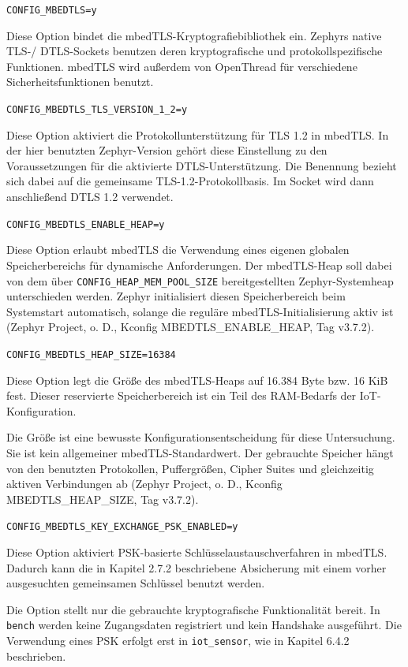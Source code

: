 \lstinline[style=codeinline]|CONFIG_MBEDTLS=y|

Diese Option bindet die mbedTLS-Kryptografiebibliothek ein. Zephyrs native TLS-/ DTLS-Sockets benutzen deren kryptografische und protokollspezifische Funktionen. mbedTLS wird au{\ss}erdem von OpenThread f{\"u}r verschiedene Sicherheitsfunktionen benutzt.

\lstinline[style=codeinline]|CONFIG_MBEDTLS_TLS_VERSION_1_2=y|

Diese Option aktiviert die Protokollunterst{\"u}tzung f{\"u}r TLS 1.2 in mbedTLS. In der hier benutzten Zephyr-Version geh{\"o}rt diese Einstellung zu den Voraussetzungen f{\"u}r die aktivierte DTLS-Unterst{\"u}tzung. Die Benennung bezieht sich dabei auf die gemeinsame TLS-1.2-Protokollbasis. Im Socket wird dann anschlie{\ss}end DTLS 1.2 verwendet.

\lstinline[style=codeinline]|CONFIG_MBEDTLS_ENABLE_HEAP=y|

Diese Option erlaubt mbedTLS die Verwendung eines eigenen globalen Speicherbereichs f{\"u}r dynamische Anforderungen. Der mbedTLS-Heap soll dabei von dem {\"u}ber \lstinline[style=codeinline]|CONFIG_HEAP_MEM_POOL_SIZE| bereitgestellten Zephyr-Systemheap unterschieden werden. Zephyr initialisiert diesen Speicherbereich beim Systemstart automatisch, solange die regul{\"a}re mbedTLS-Initialisierung aktiv ist (Zephyr Project, o. D., Kconfig MBEDTLS\_ENABLE\_HEAP, Tag v3.7.2).

\lstinline[style=codeinline]|CONFIG_MBEDTLS_HEAP_SIZE=16384|

Diese Option legt die Gr{\"o}{\ss}e des mbedTLS-Heaps auf 16.384 Byte bzw. 16 KiB fest. Dieser reservierte Speicherbereich ist ein Teil des RAM-Bedarfs der IoT-Konfiguration.

Die Gr{\"o}{\ss}e ist eine bewusste Konfigurationsentscheidung f{\"u}r diese Untersuchung. Sie ist kein allgemeiner mbedTLS-Standardwert. Der gebrauchte Speicher h{\"a}ngt von den benutzten Protokollen, Puffergr{\"o}{\ss}en, Cipher Suites und gleichzeitig aktiven Verbindungen ab (Zephyr Project, o. D., Kconfig MBEDTLS\_HEAP\_SIZE, Tag v3.7.2).

\lstinline[style=codeinline]|CONFIG_MBEDTLS_KEY_EXCHANGE_PSK_ENABLED=y|

Diese Option aktiviert PSK-basierte Schl{\"u}sselaustauschverfahren in mbedTLS. Dadurch kann die in Kapitel 2.7.2 beschriebene Absicherung mit einem vorher ausgesuchten gemeinsamen Schl{\"u}ssel benutzt werden.

Die Option stellt nur die gebrauchte kryptografische Funktionalit{\"a}t bereit. In \lstinline[style=codeinline]|bench| werden keine Zugangsdaten registriert und kein Handshake ausgef{\"u}hrt. Die Verwendung eines PSK erfolgt erst in \lstinline[style=codeinline]|iot_sensor|, wie in Kapitel 6.4.2 beschrieben.

